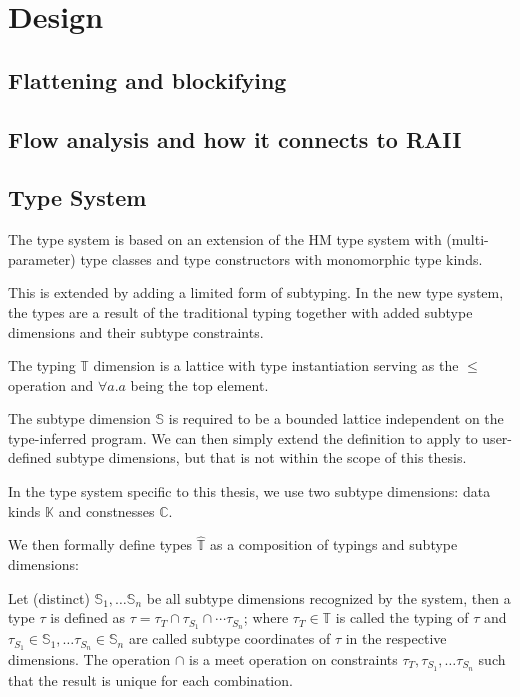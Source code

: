 \chapter{Design}



\section{Flattening and blockifying}

\section{Flow analysis and how it connects to RAII}

\section{Type System}

The type system is based on an extension of the HM type system with (multi-parameter) type classes and type constructors with monomorphic type kinds.

This is extended by adding a limited form of subtyping. In the new type system, the types are a result of the traditional typing together with added subtype dimensions and their subtype constraints.

\begin{defn}
    The typing $\mathbb{T}$ dimension is a lattice with type instantiation serving as the $\leq$ operation and $\forall a . a$ being the top element.
\end{defn}

\begin{defn}
    The subtype dimension $\mathbb{S}$ is required to be a bounded lattice independent on the type-inferred program. We can then simply extend the definition to apply to user-defined subtype dimensions, but that is not within the scope of this thesis.

    In the type system specific to this thesis, we use two subtype dimensions: data kinds $\mathbb{K}$ and constnesses $\mathbb{C}$.
\end{defn}

\begin{defn}[Types]
    We then formally define types $\widehat{\mathbb{T}}$ as a composition of typings and subtype dimensions:
    
    Let (distinct) $\mathbb{S}_1, \dots \mathbb{S}_n$ be all subtype dimensions recognized by the system, then a type $\tau$ is defined as $\tau = \tau_T \cap \tau_{S_1} \cap \cdots \tau_{S_n}$; where $\tau_T \in \mathbb{T}$ is called the typing of $\tau$ and $\tau_{S_1} \in \mathbb{S}_1, \dots \tau_{S_n} \in \mathbb{S}_n$ are called subtype coordinates of $\tau$ in the respective dimensions. The operation $\cap$ is a meet operation on constraints $\tau_T, \tau_{S_1}, \dots \tau_{S_n}$ such that the result is unique for each combination.
\end{defn}

